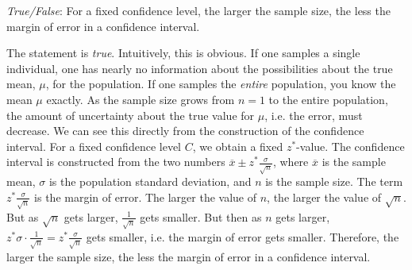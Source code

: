\documentclass[11pt,letterpaper]{article}
\begin{document}
\newpage



\quizsol \textit{True/False}: For a fixed confidence level, the larger the sample size, the less the margin of error in a confidence interval. \pspace

\sol The statement is \textit{true}. Intuitively, this is obvious. If one samples a single individual, one has nearly no information about the possibilities about the true mean, $\mu$, for the population. If one samples the \textit{entire} population, you know the mean $\mu$ exactly. As the sample size grows from $n= 1$ to the entire population, the amount of uncertainty about the true value for $\mu$, i.e. the error, must decrease. We can see this directly from the construction of the confidence interval. For a fixed confidence level $C$, we obtain a fixed $z^*$-value. The confidence interval is constructed from the two numbers $\overline{x} \pm z^* \frac{\sigma}{\sqrt{n}}$, where $\overline{x}$ is the sample mean, $\sigma$ is the population standard deviation, and $n$ is the sample size. The term $z^* \frac{\sigma}{\sqrt{n}}$ is the margin of error. The larger the value of $n$, the larger the value of $\sqrt{n}$. But as $\sqrt{n}$ gets larger, $\frac{1}{\sqrt{n}}$ gets smaller. But then as $n$ gets larger, $z^* \sigma \cdot \frac{1}{\sqrt{n}}= z^* \frac{\sigma}{\sqrt{n}}$ gets smaller, i.e. the margin of error gets smaller. Therefore, the larger the sample size, the less the margin of error in a confidence interval. 
\end{document}

